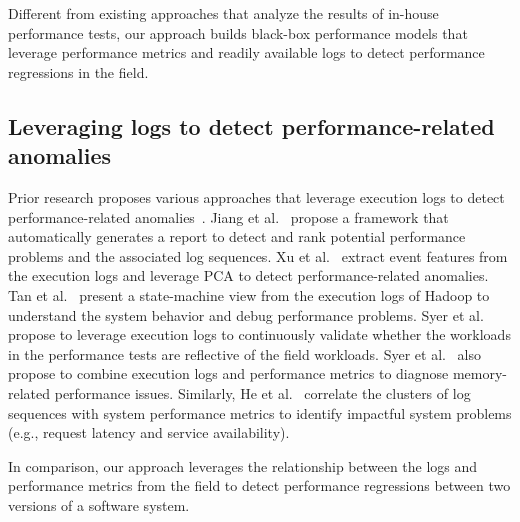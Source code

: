 Different from existing approaches that analyze the results of in-house performance tests, our approach builds black-box performance models that leverage performance metrics and readily available logs to detect performance regressions in the field.

\subsection{Leveraging logs to detect performance-related anomalies}

Prior research proposes various approaches that leverage execution logs to detect performance-related anomalies~\citep{DBLP:journals/tse/JiangH15,DBLP:conf/sosp/XuHFPJ09,DBLP:conf/icdcs/TanKGN10,DBLP:conf/sigsoft/HeLLZLZ18}. 
Jiang et al.~\citep{DBLP:conf/icsm/JiangHHF09} propose a framework that automatically generates a report to detect and rank potential performance problems and the associated log sequences. 
Xu et al.~\citep{DBLP:conf/sosp/XuHFPJ09} extract event features from the execution logs and leverage PCA to detect performance-related anomalies. 
Tan et al.~\citep{DBLP:conf/icdcs/TanKGN10} present a state-machine view from the execution logs of Hadoop to understand the system behavior and debug performance problems. 
Syer et al.~\citep{DBLP:journals/ase/SyerSJH17} propose to leverage execution logs to continuously validate whether the workloads in the performance tests are reflective of the field workloads. Syer et al.~\citep{DBLP:conf/icsm/SyerJNHNF13} also propose to combine execution logs and performance metrics to diagnose memory-related performance  issues. 
Similarly, He et al.~\citep{DBLP:conf/sigsoft/HeLLZLZ18} correlate the clusters of log sequences with system performance metrics to identify impactful system problems (e.g., request latency and service availability).

In comparison, our approach leverages the relationship between the logs and performance metrics from the field to detect performance regressions between two versions of a software system.

